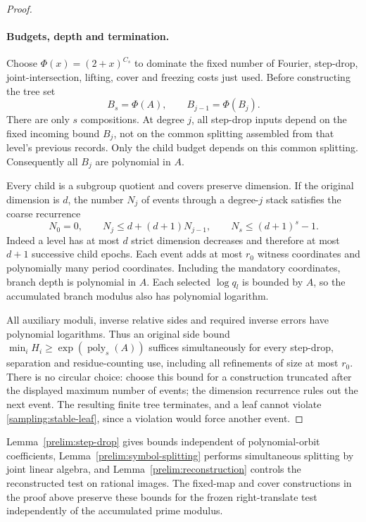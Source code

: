 \begin{proof}
\paragraph{Budgets, depth and termination.}
Choose $\Phi(x)=(2+x)^{C_s}$ to dominate the fixed number of
Fourier, step-drop, joint-intersection, lifting, cover and freezing
costs just used.  Before constructing the tree set
\[
 B_s=\Phi(A),\qquad B_{j-1}=\Phi(B_j).
\]
There are only $s$ compositions.  At degree $j$, all step-drop
inputs depend on the fixed incoming bound $B_j$, not on the
common splitting assembled from that level's previous records.
Only the child budget depends on this common splitting.
Consequently all $B_j$ are polynomial in $A$.

Every child is a subgroup quotient and covers preserve dimension.
If the original dimension is $d$, the number $N_j$ of events
through a degree-$j$ stack satisfies the coarse recurrence
\[
 N_0=0,\qquad N_j\le d+(d+1)N_{j-1},
 \qquad N_s\le(d+1)^s-1.
\]
Indeed a level has at most $d$ strict dimension decreases and
therefore at most $d+1$ successive child epochs.  Each event adds
at most $r_0$ witness coordinates and polynomially many period
coordinates.  Including the mandatory coordinates, branch depth
is polynomial in $A$.  Each selected $\log q_l$ is bounded by $A$,
so the accumulated branch modulus also has polynomial logarithm.

All auxiliary moduli, inverse relative sides and required inverse
errors have polynomial logarithms.  Thus an original side bound
$\min_iH_i\ge\exp(\operatorname{poly}_s(A))$ suffices simultaneously
for every step-drop, separation and residue-counting use, including
all refinements of size at most $r_0$.
There is no circular choice: choose this bound for a construction
truncated after the displayed maximum number of events; the
dimension recurrence rules out the next event.  The resulting
finite tree terminates, and a leaf cannot violate
\eqref{sampling:stable-leaf}, since a violation would force another
event.
\end{proof}

\begin{remark}
Lemma~\ref{prelim:step-drop} gives bounds independent of polynomial-orbit
coefficients, Lemma~\ref{prelim:symbol-splitting} performs simultaneous
splitting by joint linear algebra, and Lemma~\ref{prelim:reconstruction}
controls the reconstructed test on rational images.  The fixed-map and
cover constructions in the proof above preserve these bounds for the
frozen right-translate test independently of the accumulated prime modulus.
\end{remark}

